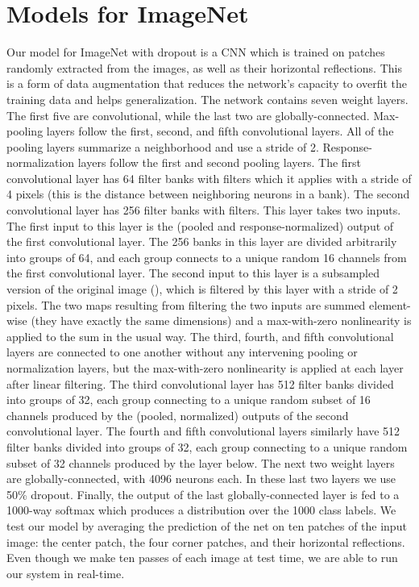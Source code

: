 \documentclass[12pt]{article}
\begin{document}
\section{Models for ImageNet}

Our model for ImageNet with dropout is a CNN which is trained on 
patches randomly extracted from the  images, as well
as their horizontal reflections. This is a form of data augmentation
that reduces the network's capacity to overfit the training data and
helps generalization. The network contains seven weight layers. The
first five are convolutional, while the last two are globally-connected.
Max-pooling layers follow the first, second, and fifth convolutional
layers. All of the pooling layers summarize a  neighborhood
and use a stride of 2. Response-normalization layers follow the first
and second pooling layers. The first convolutional layer has 64 filter
banks with  filters which it applies with a stride of
4 pixels (this is the distance between neighboring neurons in a bank).
The second convolutional layer has 256 filter banks with 
filters. This layer takes two inputs. The first input to this layer
is the (pooled and response-normalized) output of the first convolutional
layer. The 256 banks in this layer are divided arbitrarily into groups
of 64, and each group connects to a unique random 16 channels from
the first convolutional layer. The second input to this layer is a
subsampled version of the original image (), which is
filtered by this layer with a stride of 2 pixels. The two maps resulting
from filtering the two inputs are summed element-wise (they have exactly
the same dimensions) and a max-with-zero nonlinearity is applied to
the sum in the usual way. The third, fourth, and fifth convolutional
layers are connected to one another without any intervening pooling
or normalization layers, but the max-with-zero nonlinearity is applied
at each layer after linear filtering. The third convolutional layer
has 512 filter banks divided into groups of 32, each group connecting
to a unique random subset of 16 channels produced by the (pooled, normalized)
outputs of the second convolutional layer. The fourth and fifth convolutional
layers similarly have 512 filter banks divided into groups of 32,
each group connecting to a unique random subset of 32 channels produced
by the layer below. The next two weight layers are globally-connected,
with 4096 neurons each. In these last two layers we use 50\% dropout.
Finally, the output of the last globally-connected layer is fed to
a 1000-way softmax which produces a distribution over the 1000 class
labels. We test our model by averaging the prediction of the net on
ten  patches of the  input image: the
center patch, the four corner patches, and their horizontal reflections.
Even though we make ten passes of each image at test time, we are
able to run our system in real-time.
\end{document}
